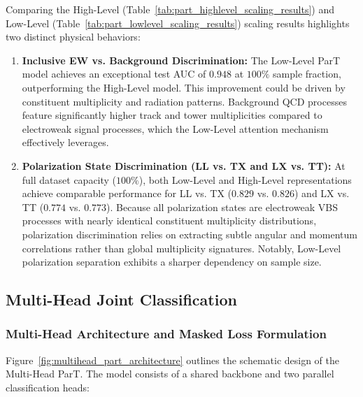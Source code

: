 \documentclass[12pt]{article}
\begin{document}
			Comparing the High-Level (Table~\ref{tab:part_highlevel_scaling_results}) and Low-Level (Table~\ref{tab:part_lowlevel_scaling_results}) scaling results highlights two distinct physical behaviors:

			\begin{enumerate}
				\item \textbf{Inclusive EW vs. Background Discrimination:} The Low-Level ParT model achieves an exceptional test AUC of $0.948$ at $100\%$ sample fraction, outperforming the High-Level model. This improvement could be driven by constituent multiplicity and radiation patterns. Background QCD processes feature significantly higher track and tower multiplicities compared to electroweak signal processes, which the Low-Level attention mechanism effectively leverages.

				\item \textbf{Polarization State Discrimination (LL vs. TX and LX vs. TT):} At full dataset capacity ($100\%$), both Low-Level and High-Level representations achieve comparable performance for LL vs. TX ($0.829$ vs. $0.826$) and LX vs. TT ($0.774$ vs. $0.773$). Because all polarization states are electroweak VBS processes with nearly identical constituent multiplicity distributions, polarization discrimination relies on extracting subtle angular and momentum correlations rather than global multiplicity signatures. Notably, Low-Level polarization separation exhibits a sharper dependency on sample size.
			\end{enumerate}



    \subsection{Multi-Head Joint Classification}%
    \label{sub:multi_head_joint_classification}
        
		\subsubsection{Multi-Head Architecture and Masked Loss Formulation}%
		\label{subs:multi_head_architecture_and_masked_loss_formulation}

			Figure~\ref{fig:multihead_part_architecture} outlines the schematic design of the Multi-Head ParT. The model consists of a shared backbone and two parallel classification heads:
\end{document}
